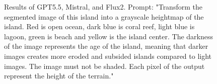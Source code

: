\begin{figure}[tb]
    \caption{Results of GPT5.5, Mistral, and Flux2. Prompt: "Transform the segmented image of this island into a grayscale heightmap of the island. Red is open ocean, dark blue is coral reef, light blue is lagoon, green is beach and yellow is the island center. The darkness of the image represents the age of the island, meaning that darker images creates more eroded and subsided islands compared to light images. The image must not be shaded. Each pixel of the output represent the height of the terrain."}
    \label{fig:training-llm-models}
\end{figure}